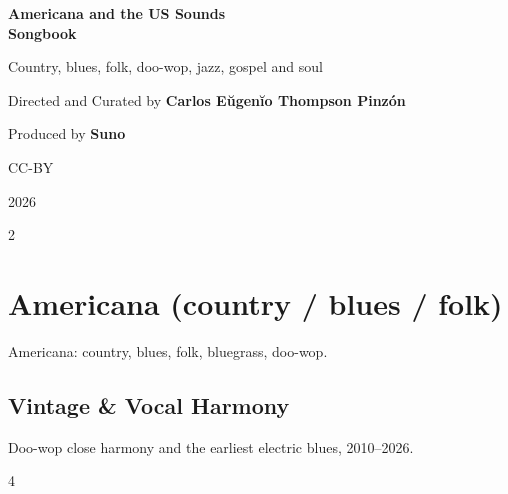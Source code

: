 \documentclass[a4paper,landscape]{memoir}
\begin{document}
\frontmatter
{}

\begin{titlingpage}
\centering
\vspace*{\fill}
{\LARGE\bfseries Americana and the US Sounds\\\Huge Songbook\par}
\bigskip
{\large Country, blues, folk, doo-wop, jazz, gospel and soul\par}
\vspace*{\fill}
{\normalsize Directed and Curated by \bfseries Carlos Eŭgenĭo Thompson Pinzón\par}
{\normalsize Produced by \bfseries Suno\par}
\bigskip
{\normalsize CC-BY\par}
{\normalsize 2026\par}
\vspace*{\fill}
\end{titlingpage}

\clearpage\begin{multicols*}{2}
\tableofcontents*
\end{multicols*}
\mainmatter
\renewcommand\chaptername{Album~}

\part{Americana (country / blues / folk)}
Americana: country, blues, folk, bluegrass, doo-wop.

\chapter{Vintage \& Vocal Harmony}
Doo-wop close harmony and the earliest electric blues, 2010–2026.
\clearpage\begin{multicols*}{4}
\end{multicols*}
\end{document}
